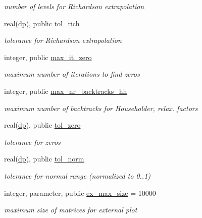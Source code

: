 \begin{DoxyCompactItemize}
\begin{DoxyCompactList}\small\item\em number of levels for Richardson extrapolation \end{DoxyCompactList}\item 
real(\hyperlink{namespacenum__vars_a03802aa2bd86439d7a9370836fabf3f2}{dp}), public \hyperlink{namespacenum__vars_aa0091a935b9502afef09a87c0f590e9d}{tol\+\_\+rich}
\begin{DoxyCompactList}\small\item\em tolerance for Richardson extrapolation \end{DoxyCompactList}\item 
integer, public \hyperlink{namespacenum__vars_ad35971574ecb900c805b8d08745160e6}{max\+\_\+it\+\_\+zero}
\begin{DoxyCompactList}\small\item\em maximum number of iterations to find zeros \end{DoxyCompactList}\item 
integer, public \hyperlink{namespacenum__vars_aa77741498300b095e49a5d8344480b68}{max\+\_\+nr\+\_\+backtracks\+\_\+hh}
\begin{DoxyCompactList}\small\item\em maximum number of backtracks for Householder, relax. factors \end{DoxyCompactList}\item 
real(\hyperlink{namespacenum__vars_a03802aa2bd86439d7a9370836fabf3f2}{dp}), public \hyperlink{namespacenum__vars_ae2387f8182114da91104322ca3250d9a}{tol\+\_\+zero}
\begin{DoxyCompactList}\small\item\em tolerance for zeros \end{DoxyCompactList}\item 
real(\hyperlink{namespacenum__vars_a03802aa2bd86439d7a9370836fabf3f2}{dp}), public \hyperlink{namespacenum__vars_a301b25f19135f2bee8ccce99257ae86c}{tol\+\_\+norm}
\begin{DoxyCompactList}\small\item\em tolerance for normal range (normalized to 0..1) \end{DoxyCompactList}\item 
integer, parameter, public \hyperlink{namespacenum__vars_a032fd6a1d45689b56362d8aab1cdc57c}{ex\+\_\+max\+\_\+size} = 10000
\begin{DoxyCompactList}\small\item\em maximum size of matrices for external plot \end{DoxyCompactList}\item 

\end{DoxyCompactItemize}
